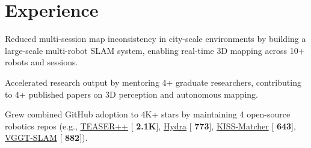 \documentclass[]{deedy-resume-openfont}
\newcommand{\githubstars}[1]{[{\faGithubSquare}\,\ding{72}\,\textbf{#1}]}
\begin{document}
\begin{minipage}[t]{0.66\textwidth}

%
%
\section{Experience}

\vspace{0.3cm}
\begin{tightemize}
\item Reduced multi-session map inconsistency in city-scale environments by building a large-scale multi-robot SLAM system, enabling real-time 3D mapping across 10+ robots and sessions.
\item Accelerated research output by mentoring 4+ graduate researchers, contributing to 4+ published papers on 3D perception and autonomous mapping.
\item Grew combined GitHub adoption to 4K+ stars by maintaining 4 open-source robotics repos (e.g., \href{https://github.com/MIT-SPARK/TEASER-plusplus}{TEASER++} \githubstars{2.1K}, \href{https://github.com/MIT-SPARK/Hydra}{Hydra} \githubstars{773}, \href{https://github.com/MIT-SPARK/KISS-Matcher}{KISS-Matcher} \githubstars{643}, \href{https://github.com/MIT-SPARK/VGGT-SLAM}{VGGT-SLAM} \githubstars{882}).
\end{tightemize}
\sectionsep


\end{minipage}
\end{document}
